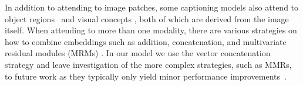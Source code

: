 
In addition to attending to image patches, some captioning models also attend
to object regions~\cite{Wang2019Hierarchical} and visual concepts
\cite{You2016ImageCW,Li2019Boosted,Wang2019Hierarchical}, both of which are
derived from the image itself. When attending to more than one modality, there
are various strategies on how to combine embeddings such as addition,
concatenation, and multivariate residual modules (MRMs)
\cite{Kim2016MultimodalRL}. In our model we use the vector concatenation
strategy and leave investigation of the more complex strategies, such as MMRs,
to future work as they typically only yield minor performance
improvements~\cite{Wang2019Hierarchical}.
